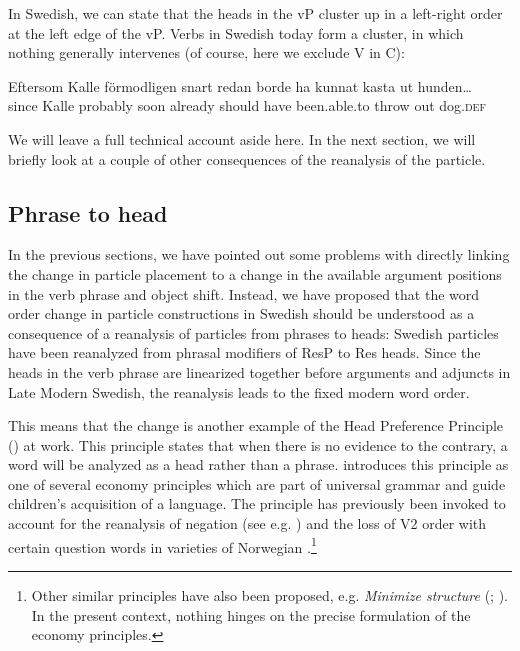 \documentclass[output=paper]{langscibook}
\begin{document}
\z

In Swedish, we can state that the heads in the vP cluster up in a left-right order at the left edge of the vP. Verbs in Swedish today form a cluster, in which nothing generally intervenes (of course, here we exclude V in C):


\ea\label{ex:lalu:57}
\gll  Eftersom  Kalle    förmodligen  snart  redan    borde  ha    kunnat kasta     ut   hunden…\\
since         Kalle    probably     soon     already   should  have   been.able.to throw   out  dog\textsc{.def}\\
\z


We will leave a full technical account aside here. In the next section, we will briefly look at a couple of other consequences of the reanalysis of the particle. 


\subsection{Phrase to head}\label{sec:lalu:6.3}

In the previous sections, we have pointed out some problems with directly linking the change in particle placement to a change in the available argument positions in the verb phrase and object shift. Instead, we have proposed that the word order change in particle constructions in Swedish should be understood as a consequence of a reanalysis of particles from phrases to heads: Swedish particles have been reanalyzed from phrasal modifiers of ResP to Res heads. Since the heads in the verb phrase are linearized together before arguments and adjuncts in Late Modern Swedish, the reanalysis leads to the fixed modern word order. 



This means that the change is another example of the Head Preference Principle (\citealt{van_Gelderen2004}) at work. This principle states that when there is no evidence to the contrary, a word will be analyzed as a head rather than a phrase. \citet{van_Gelderen2004} introduces this principle as one of several economy principles which are part of universal grammar and guide children’s acquisition of a language. The principle has previously been invoked to account for the reanalysis of negation (see e.g. \citealt{Van_gelderen2008}) and the loss of V2 order with certain question words in varieties of Norwegian \citep{WestergaardEtAl2017}.\footnote{Other similar principles have also been proposed, e.g. \textit{Minimize structure} (\citealt{CardinalettiStarke1999}; \citealt{BreitbarthEtAl2020}). In the present context, nothing hinges on the precise formulation of the economy principles.}  
\end{document}
